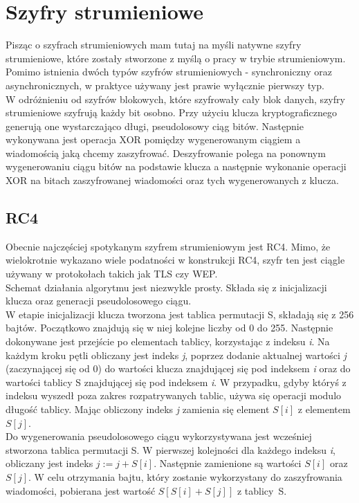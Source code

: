 \section{Szyfry strumieniowe}
Pisząc o szyfrach strumieniowych mam tutaj na myśli natywne szyfry strumieniowe, które zostały stworzone z myślą o pracy w trybie strumieniowym. 
Pomimo istnienia dwóch typów szyfrów strumieniowych - synchroniczny oraz asynchronicznych, w praktyce używany jest prawie wyłącznie pierwszy typ. \\
W odróżnieniu od szyfrów blokowych, które szyfrowały cały blok danych, szyfry strumieniowe szyfrują każdy bit osobno. 
Przy użyciu klucza kryptograficznego generują one wystarczająco długi, pseudolosowy ciąg bitów. 
Następnie wykonywana jest operacja XOR pomiędzy wygenerowanym ciągiem a wiadomością jaką chcemy zaszyfrować. 
Deszyfrowanie polega na ponownym wygenerowaniu ciągu bitów na podstawie klucza a następnie wykonanie operacji XOR na bitach zaszyfrowanej wiadomości oraz tych wygenerowanych z klucza.

\subsection{RC4}
Obecnie najczęściej spotykanym szyfrem strumieniowym jest RC4. Mimo, że wielokrotnie wykazano wiele podatności w konstrukcji RC4, szyfr ten jest ciągle używany w protokołach takich jak TLS czy WEP. \\
Schemat działania algorytmu jest niezwykle prosty. 
Składa się z inicjalizacji klucza oraz generacji pseudolosowego ciągu. \\
W etapie inicjalizacji klucza tworzona jest tablica permutacji S, składają się z 256 bajtów. 
Początkowo znajdują się w niej kolejne liczby od 0 do 255. 
Następnie dokonywane jest przejście po elementach tablicy, korzystając z indeksu \textit{i}. Na każdym kroku pętli obliczany jest indeks \textit{j}, poprzez dodanie aktualnej wartości \textit{j} (zaczynającej się od 0) do wartości klucza znajdującej się pod indeksem \textit{i} oraz do wartości tablicy S znajdującej się pod indeksem \textit{i}. W przypadku, gdyby któryś z indeksu wyszedł poza zakres rozpatrywanych tablic, używa się operacji modulo długość tablicy. Mając obliczony indeks \textit{j} zamienia się element $S[i]$ z elementem $S[j]$. \\
Do wygenerowania pseudolosowego ciągu wykorzystywana jest wcześniej stworzona tablica permutacji S. W pierwszej kolejności dla każdego indeksu \textit{i}, obliczany jest indeks $j := j + S[i]$. 
Następnie zamienione są wartości $S[i]$ oraz $S[j]$. W celu otrzymania bajtu, który zostanie wykorzystany do zaszyfrowania wiadomości, pobierana jest wartość $S[S[i] + S[j]]$ z tablicy~S.

